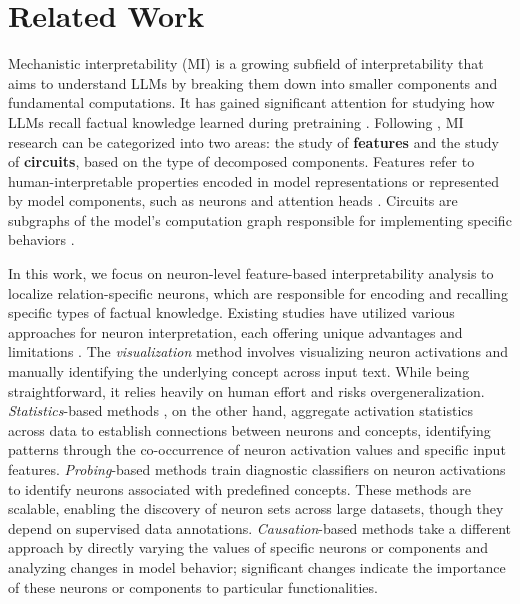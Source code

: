 \section{Related Work}
Mechanistic interpretability (MI) is a growing subfield of interpretability that aims to understand LLMs by breaking them down into smaller components and fundamental computations. It has gained significant attention for studying how LLMs recall factual knowledge learned during pretraining \citep{meng2022locating,dai-etal-2022-knowledge,geva-etal-2023-dissecting,yu-etal-2023-characterizing,lv2024interpreting,wang-etal-2024-unveiling}. 
Following \citet{olah2020zoom, rai2024practical}, MI research can be categorized into two areas: the study of \textbf{features} and the study of \textbf{circuits}, based on the type of decomposed components. Features refer to human-interpretable properties encoded in model representations or represented by model components, such as neurons and attention heads \citep{elhage2022solu, gurnee2023finding}. Circuits are subgraphs of the model's computation graph responsible for implementing specific behaviors 
\citep{wang2022interpretability, elhage2021mathematical}.

In this work, we focus on neuron-level feature-based interpretability analysis to localize relation-specific neurons, which are responsible for encoding and recalling specific types of factual knowledge. Existing studies have utilized various approaches for neuron interpretation, each offering unique advantages and limitations \cite{sajjad-etal-2022-neuron, rai2024practical}. The \textit{visualization} method \citep{olsson2022context, elhage2022solu, lieberum2023does, bills2023language,liu-etal-2024-unraveling} involves visualizing neuron activations and manually identifying the underlying concept across input text. While being straightforward, it relies heavily on human effort and risks overgeneralization. \textit{Statistics}-based methods \citep{Bau2019Identifying,neuron2022Cuadros,kojima-etal-2024-multilingual,yu-ananiadou-2024-neuron,tang-etal-2024-language,wang-etal-2024-unveiling}, on the other hand, aggregate activation statistics across data to establish connections between neurons and concepts, identifying patterns through the co-occurrence of neuron activation values and specific input features. \textit{Probing}-based methods \citep{dalvi2019one,  durrani-etal-2020-analyzing, antverg2021pitfalls, gurnee2024universal} train diagnostic classifiers on neuron activations to identify neurons associated with predefined concepts. These methods are scalable, enabling the discovery of neuron sets across large datasets, though they depend on supervised data annotations. \textit{Causation}-based methods \citep{vig2020investigating, meng2022locating, meng2022mass, kramar2024atp,song-etal-2024-large} take a different approach by directly varying the values of specific neurons or components and analyzing changes in model behavior; significant changes indicate the importance of these neurons or components to particular functionalities. 

